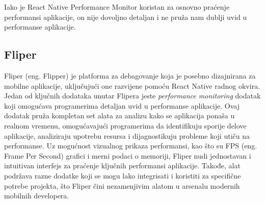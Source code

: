 \documentclass[12pt,oneside]{memoir}
\begin{document}
Iako je React Native Performance Monitor koristan za osnovno praćenje performansi aplikacije, on nije dovoljno detaljan i ne pruža nam dublji uvid u performanse aplikacije.

\subsection{Fliper}

Fliper (eng. Flipper) je platforma za debagovanje koja je posebno dizajnirana za mobilne aplikacije, uključujući one razvijene pomoću React Native radnog okvira. Jedan od ključnih dodataka unutar Flipera jeste \textit{performance monitoring} dodatak koji omogućava programerima detaljan uvid u performanse aplikacije. Ovaj dodatak pruža kompletan set alata za analizu kako se aplikacija ponaša u realnom vremenu, omogućavajući programerima da identifikuju sporije delove aplikacije, analiziraju upotrebu resursa i dijagnostikuju probleme koji utiču na performanse. Uz mogućnost vizualnog prikaza performansi, kao što su FPS (eng. Frame Per Second) grafici i merni podaci o memoriji, Fliper nudi jednostavan i intuitivan interfejs za praćenje ključnih performansi aplikacije. Takođe, alat podržava razne dodatke koji se mogu lako integrisati i koristiti za specifične potrebe projekta, što Fliper čini nezamenjivim alatom u arsenalu modernih mobilnih developera.

\begin{figure}[!h]
    \centering
    \qquad
    \label{fig:example}%
\end{figure}
\end{document}
